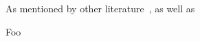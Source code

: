 As mentioned by other literature~\cite{bazelAttributeFlaky,lam2019idflakies}, as well as~\cite{wong2016survey}

Foo %
